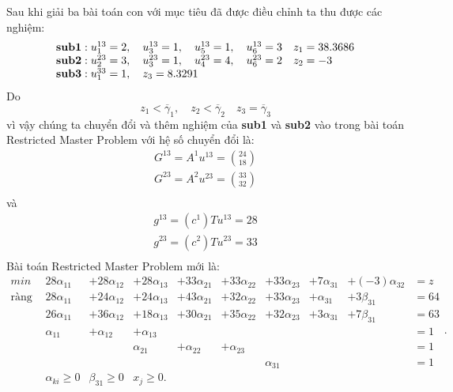 Sau khi giải ba bài toán con với mục tiêu đã được điều chỉnh ta thu được các nghiệm:
\begin{displaymath}
\begin{array}{llll}
{\bf sub1}: u_1^{13}=2,\quad u_3^{13}=1,\quad u_5^{13}=1,\quad u_6^{13}=3\quad z_1=38.3686\\
{\bf sub2}: u_2^{23}=3,\quad u_3^{23}=1,\quad u_4^{23}=4,\quad u_6^{23}=2\quad z_2=-3\\
{\bf sub3}: u_1^{33}=1,\quad z_3=8.3291
\end{array}
\end{displaymath}
Do
\begin{displaymath}z_1<\overline\gamma_1,\quad z_2<\overline\gamma_2\quad z_3=\overline\gamma_3\end{displaymath}
vì vậy chúng ta chuyển đổi và thêm nghiệm của {\bf sub1} và {\bf sub2} vào trong bài toán Restricted Master Problem với hệ số chuyển đổi là:
\begin{displaymath}
\begin{array}{ll}
G^{13}=A^{1}u^{13}=\binom{24}{18}\\
G^{23}=A^{2}u^{23}=\binom{33}{32}\\
\end{array}
\end{displaymath}
và
\begin{displaymath}
\begin{array}{ll}
g^{13}=(c^1)Tu^{13}=28\\
g^{23}=(c^2)Tu^{23}=33\\
\end{array}
\end{displaymath}
Bài toán Restricted Master Problem mới là:
\begin{equation}\label{PT1018}
\begin{array}{lllllllllll}
min&28\alpha_{11}&+28\alpha_{12}&+28\alpha_{13}&+33\alpha_{21}&+33\alpha_{22}&+33\alpha_{23}&+7\alpha_{31}&+(-3)\alpha_{32}&=z\\
\textrm{ràng buộc}&28\alpha_{11}&+24\alpha_{12}&+24\alpha_{13}&+43\alpha_{21}&+32\alpha_{22}&+33\alpha_{23}&+\alpha_{31}&+3\beta_{31}&=64\\
&26\alpha_{11}&+36\alpha_{12}&+18\alpha_{13}&+30\alpha_{21}&+35\alpha_{22}&+32\alpha_{23}&+3\alpha_{31}&+7\beta_{31}&=63\\
&\alpha_{11}&+\alpha_{12}&+\alpha_{13}&&&&&&=1\\
&&&\alpha_{21}&+\alpha_{22}&+\alpha_{23}&&&&=1\\
&&&&&&\alpha_{31}&&&=1\\
&\alpha_{ki}\geq0&\beta_{31}\geq0& x_j\geq0.
\end{array}.
\end{equation}
